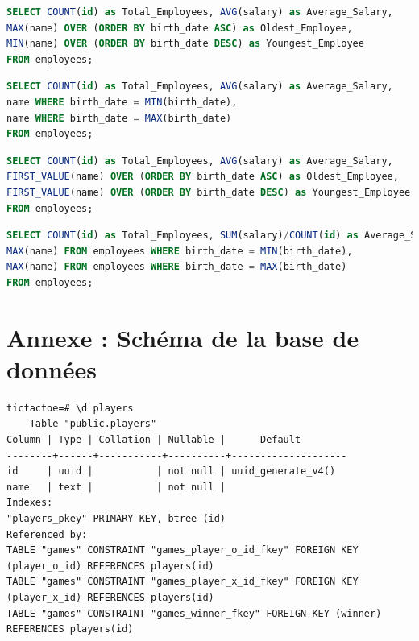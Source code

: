 \documentclass[12pt,a4paper]{article}
\begin{document}
\begin{flushleft}
\begin{choices}
\item \hspace{1cm}\begin{lstlisting}[language=SQL]
SELECT COUNT(id) as Total_Employees, AVG(salary) as Average_Salary,
MAX(name) OVER (ORDER BY birth_date ASC) as Oldest_Employee,
MIN(name) OVER (ORDER BY birth_date DESC) as Youngest_Employee
FROM employees;
\end{lstlisting}
\item \hspace{1cm}\begin{lstlisting}[language=SQL]
SELECT COUNT(id) as Total_Employees, AVG(salary) as Average_Salary,
name WHERE birth_date = MIN(birth_date),
name WHERE birth_date = MAX(birth_date)
FROM employees;
\end{lstlisting}
\item \hspace{1cm}\begin{lstlisting}[language=SQL]
SELECT COUNT(id) as Total_Employees, AVG(salary) as Average_Salary,
FIRST_VALUE(name) OVER (ORDER BY birth_date ASC) as Oldest_Employee,
FIRST_VALUE(name) OVER (ORDER BY birth_date DESC) as Youngest_Employee
FROM employees;
\end{lstlisting}
\item \hspace{1cm}\begin{lstlisting}[language=SQL]
SELECT COUNT(id) as Total_Employees, SUM(salary)/COUNT(id) as Average_Salary,
MAX(name) FROM employees WHERE birth_date = MIN(birth_date),
MAX(name) FROM employees WHERE birth_date = MAX(birth_date)
FROM employees;
\end{lstlisting}
\end{choices}

\newpage
\appendix
\section{Annexe : Schéma de la base de données}

\begin{lstlisting}[style=terminalStyle]
tictactoe=# \d players
    Table "public.players"
Column | Type | Collation | Nullable |      Default
--------+------+-----------+----------+--------------------
id     | uuid |           | not null | uuid_generate_v4()
name   | text |           | not null |
Indexes:
"players_pkey" PRIMARY KEY, btree (id)
Referenced by:
TABLE "games" CONSTRAINT "games_player_o_id_fkey" FOREIGN KEY (player_o_id) REFERENCES players(id)
TABLE "games" CONSTRAINT "games_player_x_id_fkey" FOREIGN KEY (player_x_id) REFERENCES players(id)
TABLE "games" CONSTRAINT "games_winner_fkey" FOREIGN KEY (winner) REFERENCES players(id)


\end{lstlisting}
\end{flushleft}
\end{document}
